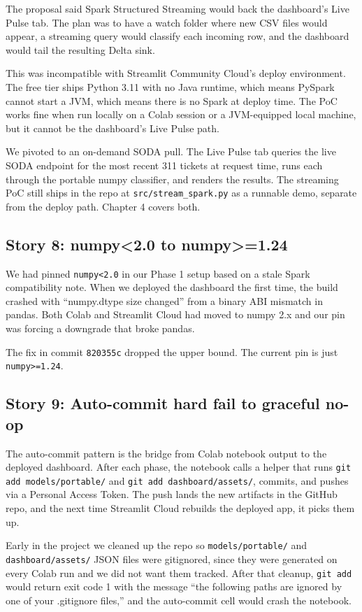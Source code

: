 \documentclass[11pt,letterpaper]{book}
\begin{document}
The proposal said Spark Structured Streaming would back the dashboard's Live Pulse tab. The plan was to have a watch folder where new CSV files would appear, a streaming query would classify each incoming row, and the dashboard would tail the resulting Delta sink.

This was incompatible with Streamlit Community Cloud's deploy environment. The free tier ships Python 3.11 with no Java runtime, which means PySpark cannot start a JVM, which means there is no Spark at deploy time. The PoC works fine when run locally on a Colab session or a JVM-equipped local machine, but it cannot be the dashboard's Live Pulse path.

We pivoted to an on-demand SODA pull. The Live Pulse tab queries the live SODA endpoint for the most recent 311 tickets at request time, runs each through the portable numpy classifier, and renders the results. The streaming PoC still ships in the repo at \texttt{src/stream\_spark.py} as a runnable demo, separate from the deploy path. Chapter 4 covers both.

\subsection*{Story 8: numpy<2.0 to numpy>=1.24}

We had pinned \texttt{numpy<2.0} in our Phase 1 setup based on a stale Spark compatibility note. When we deployed the dashboard the first time, the build crashed with ``numpy.dtype size changed'' from a binary ABI mismatch in pandas. Both Colab and Streamlit Cloud had moved to numpy 2.x and our pin was forcing a downgrade that broke pandas.

The fix in commit \texttt{820355c} dropped the upper bound. The current pin is just \texttt{numpy>=1.24}.

\subsection*{Story 9: Auto-commit hard fail to graceful no-op}

The auto-commit pattern is the bridge from Colab notebook output to the deployed dashboard. After each phase, the notebook calls a helper that runs \texttt{git add models/portable/} and \texttt{git add dashboard/assets/}, commits, and pushes via a Personal Access Token. The push lands the new artifacts in the GitHub repo, and the next time Streamlit Cloud rebuilds the deployed app, it picks them up.

Early in the project we cleaned up the repo so \texttt{models/portable/} and \texttt{dashboard/assets/} JSON files were gitignored, since they were generated on every Colab run and we did not want them tracked. After that cleanup, \texttt{git add} would return exit code 1 with the message ``the following paths are ignored by one of your .gitignore files,'' and the auto-commit cell would crash the notebook.
\end{document}
